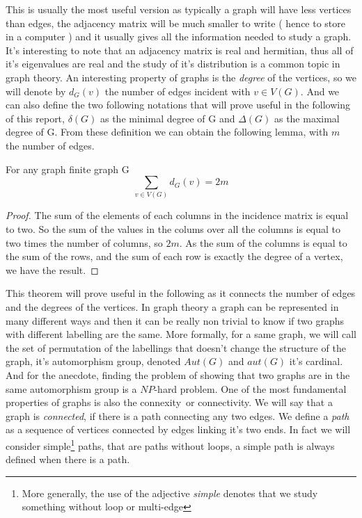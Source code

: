 This is usually the most useful version as typically a graph will have less vertices than edges, the adjacency matrix will be much smaller to write ( hence to store in a computer ) and it usually gives all the information needed to study a graph. 
It's interesting to note that an adjacency matrix is real and hermitian, thus all of it's eigenvalues are real and the study of it's distribution is a common topic in graph theory.
\newline
An interesting property of graphs is the \emph{degree} of the vertices, so we will denote by $d_G(v)$ the number of edges incident with $v \in V(G)$. And we can also define the two following notations that will prove useful in the following of this report, $\delta(G)$ as the minimal degree of G and $\Delta(G)$ as the maximal degree of G.
From these definition we can obtain the following lemma, with $m$ the number of edges.
\begin{theorem}
For any graph finite graph G
\begin{equation}
    \sum_{v\in V(G)} d_G(v) = 2m
\end{equation}
\end{theorem}
\begin{proof}
The sum of the elements of each columns in the incidence matrix is equal to two. So the sum of the values in the colums over all the columns is equal to two times the number of columns, so $2m$. As the sum of the columns is equal to the sum of the rows, and the sum of each row is exactly the degree of a vertex, we have the result.  
\end{proof}
This theorem will prove useful in the following as it connects the number of edges and the degrees of the vertices. In graph theory a graph can be represented in many different ways and then it can be really non trivial to know if two graphs with different labelling are the same. More formally, for a same graph, we will call the set of permutation of the labellings that doesn't change the structure of the graph, it's automorphism group, denoted $Aut(G)$ and $aut(G)$ it's cardinal. And for the anecdote, finding the problem of showing that two graphs are in the same automorphism group is a $NP$-hard problem.
\newline
One of the most fundamental properties of graphs is also the connexity or connectivity. 
We will say that a graph is \emph{connected}, if there is a path connecting any two edges. 
We define a \emph{path} as a sequence of vertices connected by edges linking it's two ends. 
In fact we will consider simple\footnote{ More generally, the use of the adjective \emph{simple} denotes that we study something without loop or multi-edge}  paths, that are paths without loops, a simple path is always defined when there is a path. 

